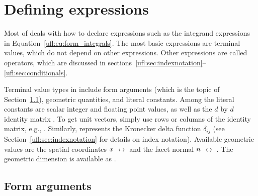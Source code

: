 \section{Defining expressions}
\label{ufl:sec:defexpr}

Most of \ufl{} deals with how to declare expressions such as the
integrand expressions in Equation~\ref{ufl:eq:form_integrals}.  The most
basic expressions are terminal values, which do not depend on other
expressions.  Other expressions are called operators, which are discussed
in sections~\ref{ufl:sec:indexnotation}--\ref{ufl:sec:conditionals}.

Terminal value types in \ufl{} include form arguments (which is the
topic of Section~\ref{ufl:sec:arguments}), geometric quantities, and
literal constants.  Among the literal constants are scalar integer
and floating point values, as well as the $d$ by $d$ identity matrix
.  To get unit vectors, simply use rows or
columns of the identity matrix, e.g., .  Similarly,
 represents the Kronecker delta function $\delta_{ij}$
(see Section~\ref{ufl:sec:indexnotation} for details on index
notation).  Available geometric values are the spatial coordinates
${x}$ $\leftrightarrow$  and the facet normal ${n}$
$\leftrightarrow$ .  The geometric dimension is available
as .

\subsection{Form arguments} \label{ufl:sec:arguments}

